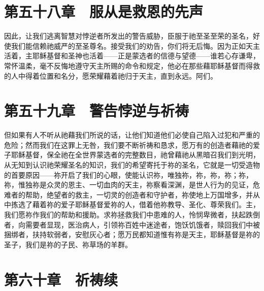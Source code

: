 
\section{第五十八章　服从是救恩的先声}

因此，让我们逃离智慧对悖逆者所发出的警告威胁，臣服于祂至圣至荣的圣名，好使我们能信赖祂威严的至圣尊名。接受我们的劝告，你们将无后悔。因为正如天主活着，主耶稣基督和圣神也活着——正是蒙选者的信德与望德——谁若心存谦卑，常怀温柔，毫不反悔地遵守天主所赐的命令和规定，他必在那些藉耶稣基督而得救的人中得着位置和名分，愿荣耀藉着祂归于天主，直到永远。阿们。\par


\section{第五十九章　警告悖逆与祈祷}

但如果有人不听从祂藉我们所说的话，让他们知道他们必使自己陷入过犯和严重的危险；然而我们在这罪上无咎，我们要不断祈祷和恳求，愿万有的创造者藉祂的爱子耶稣基督，保全祂在全世界蒙选者的完整数目，祂曾藉祂从黑暗召我们到光明，从无知到认识祂荣耀圣名的知识，我们的希望寄托于祢的圣名，它就是一切受造物的首要原因——祢开启了我们的心眼，使能认识祢，唯独祢，祢，祢，祢；祢，祢，惟独祢是众灵的恩主、一切血肉的天主，祢察看深渊，是世人行为的见证，危难者的帮助，绝望者的救主，一切灵的创造者和守护者，祢使地上万国增多，并从中拣选了藉着祢的爱子耶稣基督爱祢的人，借着他祢教导、圣化、尊荣我们。主，我们愿祢作我们的帮助和援助。求祢拯救我们中患难的人，怜悯卑微者，扶起跌倒者，向需要者显现，医治病人，引领祢百姓中迷途者，饱饫饥饿者，赎回我们中被捆绑者，扶持软弱者，安慰灰心者；愿万民都知道惟有祢是天主，耶稣基督是祢的圣子，我们是祢的子民、祢草场的羊群。\par


\section{第六十章　祈祷续}

